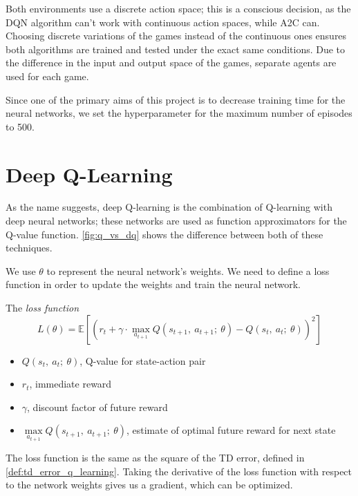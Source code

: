 

Both environments use a discrete action space; this is a conscious decision, as
the DQN algorithm can't work with continuous action spaces, while A2C can.
Choosing discrete variations of the games instead of the continuous ones
ensures both algorithms are trained and tested under the exact same conditions.
Due to the difference in the input and output space of the games, separate
agents are used for each game.

Since one of the primary aims of this project is to decrease training time for
the neural networks, we set the hyperparameter for the maximum number of
episodes to 500.

\section{Deep Q-Learning}
As the name suggests, deep Q-learning is the combination of Q-learning with
deep neural networks; these networks are used as function approximators for the
Q-value function. \autoref{fig:q_vs_dq} shows the difference between both of
these techniques.



\newpage

We use $\theta$ to represent the neural network's weights. We need to define a
loss function in order to update the weights and train the neural network.

\begin{definition}
  The \textit{loss function}
  $$L(\theta)=\mathbb{E}\left[\left(r_t+\gamma\cdot\max_{a_{t+1}}Q(s_{t+1},~a_{t+1};~\theta)-Q(s_{t},~a_{t};~\theta)\right)^{2}\right]$$
  \begin{itemize}[label={}]
    \item $Q(s_t,~a_t;~\theta)$, Q-value for state-action pair
    \item $r_t$, immediate reward
    \item $\gamma$, discount factor of future reward
    \item $\max\limits_{a_{t+1}} Q(s_{t+1},~a_{t+1};~\theta)$, estimate of optimal future reward for next state
  \end{itemize}
\end{definition}

The loss function is the same as the square of the TD error, defined in
\autoref{def:td_error_q_learning}. Taking the derivative of the loss function
with respect to the network weights gives us a gradient, which can be
optimized.

